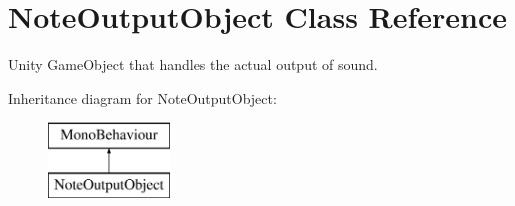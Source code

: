 \hypertarget{class_note_output_object}{}\section{Note\+Output\+Object Class Reference}
\label{class_note_output_object}


Unity Game\+Object that handles the actual output of sound.  


Inheritance diagram for Note\+Output\+Object\+:\begin{figure}[H]
\begin{center}
\leavevmode
\includegraphics[height=2.000000cm]{class_note_output_object}
\end{center}
\end{figure}
